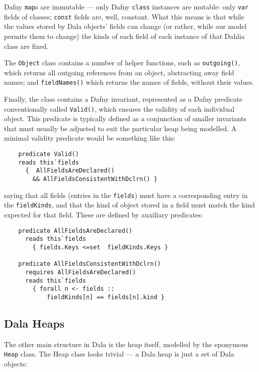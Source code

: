 Dafny \lstinline+map+s are immutable --- only Dafny \lstinline+class+ instances are mutable: only \lstinline+var+ fields of classes; \lstinline+const+ fields are, well, constant.  What this means is that while the values stored by Dala objects' fields can change (or rather, while our model permits them to change) the kinds of each field of each instance of that Dahlia class are fixed.

The \lstinline+Object+ class contains a number of helper functions, such as \lstinline+outgoing()+, which returns all outgoing references from an object, abstracting away field names; and \lstinline+fieldNames()+ which returns the names of fields, without their values. 

Finally, the class contains a Dafny invariant, represented as a Dafny predicate conventionally called \lstinline+Valid()+, which ensures the validity of each individual object.  This predicate is typically defined as a conjunction of smaller invariants that must usually be adjusted to suit the particular heap being modelled. A minimal validity predicate would be something like this: 

\begin{lstlisting}
    predicate Valid()
    reads this`fields
      {  AllFieldsAreDeclared() 
        && AllFieldsConsistentWithDclrn() }
\end{lstlisting}

\noindent saying that all fields (entries in the \lstinline+fields+) must have a corresponding entry in the \lstinline+fieldKinds+, and that the kind of object stored in a field must match the kind expected for that field.  These are defined by auxiliary predicates: 

\begin{lstlisting}
    predicate AllFieldsAreDeclared() 
      reads this`fields 
        { fields.Keys <=set  fieldKinds.Keys }

    predicate AllFieldsConsistentWithDclrn() 
      requires AllFieldsAreDeclared()
      reads this`fields 
        { forall n <- fields ::
            fieldKinds[n] == fields[n].kind }
\end{lstlisting}



\subsection{Dala Heaps}

The other main structure in Dala is the heap itself, modelled by the eponymous \lstinline+Heap+ class. The Heap class looks trivial --- a Dala heap is just a set of Dala objects:

